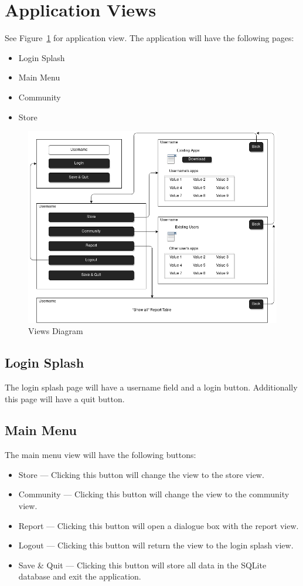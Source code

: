 \documentclass{article}
\begin{document}
\section{Application Views}
See Figure~\ref{views} for application view.
The application will have the following pages:
\begin{itemize}
    \item{Login Splash}
    \item{Main Menu}
    \item{Community}
    \item{Store}
\end{itemize}
\begin{figure}[ht!]
    \centering
    \includegraphics[width=.85\textwidth]{views.png}
    \caption{Views Diagram\label{views}}
\end{figure}
\subsection{Login Splash}
The login splash page will have a username field and a login button.
Additionally this page will have a quit button.
\subsection{Main Menu}
The main menu view will have the following buttons:
\begin{itemize}
    \item{Store}
        --- Clicking this button will change the view to the store view.
    \item{Community}
        --- Clicking this button will change the view to the community view.
    \item{Report}
        --- Clicking this button will open a dialogue box with the report view.
    \item{Logout}
        --- Clicking this button will return the view to the login splash view.
    \item{Save \& Quit}
        --- Clicking this button will store all data in the SQLite database and exit the application.
\end{itemize}
\end{document}

